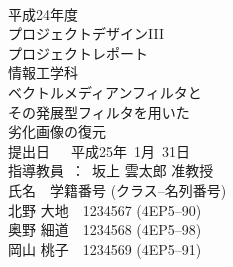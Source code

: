 

\begin{titlepage}
 \begin{center}
  ~\\
  \vspace{1cm}
  {\Large 
  平成24年度\\
 プロジェクトデザインIII\\
  プロジェクトレポート\\
情報工学科\\}
  \vspace{1.3in}
  {\Huge \gt 
ベクトルメディアンフィルタと\\
その発展型フィルタを用いた\\
劣化画像の復元\\
  }
  \vspace{2in}
  {\LARGE 
  提出日~~~平成25年~1月~31日\\
  \vspace{0.4in}
  指導教員~：~坂上 雲太郎 准教授\\
 \vspace{0.9in}
  氏名　学籍番号 (クラス--名列番号)\\
  \vspace{2mm}
  北野 大地　1234567 (4EP5--90)\\
  奥野 細道　1234568 (4EP5--98)\\
  岡山 桃子　1234569 (4EP5--91)\\
  }
 \end{center}
\end{titlepage}
